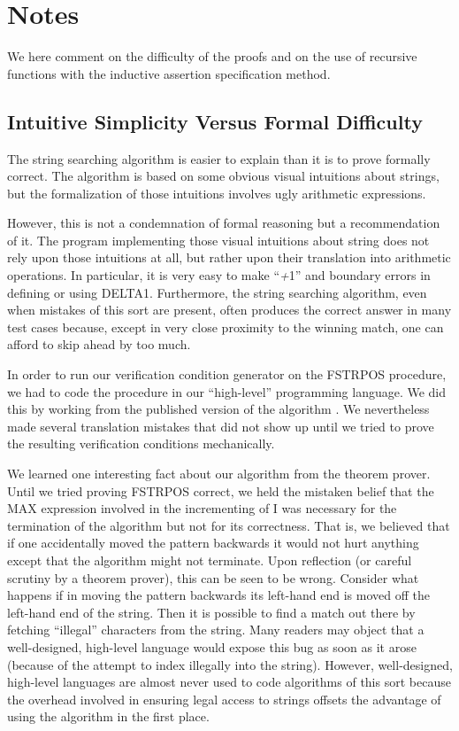 \documentclass[11pt]{book}
\newcommand{\pubinlineunderline}[1]{\emph{#1}}
\newcommand{\pubdefaulttextsize}{\large}
\begin{document}
\section{Notes}
\pubdefaulttextsize
We here comment on the difficulty of the proofs and on the
use of recursive functions with the inductive assertion specification method.
\subsection{Intuitive Simplicity Versus Formal Difficulty}
\pubdefaulttextsize
The string searching algorithm is easier to explain than it is to prove formally correct.
The algorithm is based on some
obvious visual intuitions about strings, but the formalization
of those intuitions involves ugly arithmetic expressions.

However, this is not a condemnation of formal reasoning but
a recommendation of it.  The program
implementing those visual intuitions about string
does not rely upon those intuitions at all,
but rather upon their translation into arithmetic operations.
In particular, it is very easy to make ``\pubinlineunderline{+}1'' and boundary
errors in defining
or using DELTA1.
Furthermore, the string searching algorithm, even when  mistakes of
this sort are present, often produces the correct answer in many test cases because, except in very
close proximity to the winning match, one can afford to skip ahead by
too much.

In order to run our verification condition generator
on the FSTRPOS procedure, we had to code the procedure in our ``high-level''
programming language.  We did this by working from the published version of the
algorithm \cite{FSTRPOS}.  We nevertheless made several
translation mistakes that did not show up until we tried to prove
the resulting verification conditions mechanically.

We learned one interesting fact about our algorithm from the theorem
prover.  Until we tried proving FSTRPOS correct, we held the mistaken belief
that the MAX expression involved in the incrementing of I was
necessary for the termination of the algorithm but not for its correctness.
That is, we believed that if one accidentally moved the pattern backwards
it would not hurt anything except that the algorithm might not terminate.
Upon reflection (or careful scrutiny by a theorem prover), this can be seen to be wrong.
Consider what happens if in moving the pattern backwards
its left-hand end is moved off the left-hand end of the string.
Then it is possible to find a match out there by fetching ``illegal''
characters from the string.  Many readers may object
that a well-designed, high-level language would expose this bug as soon as it
arose (because of the attempt to  index illegally into the string).
However, well-designed, high-level languages are almost never
used to code algorithms of this sort because the overhead involved
in ensuring legal access to strings 
offsets the advantage of using the algorithm in the first place.
\end{document}
